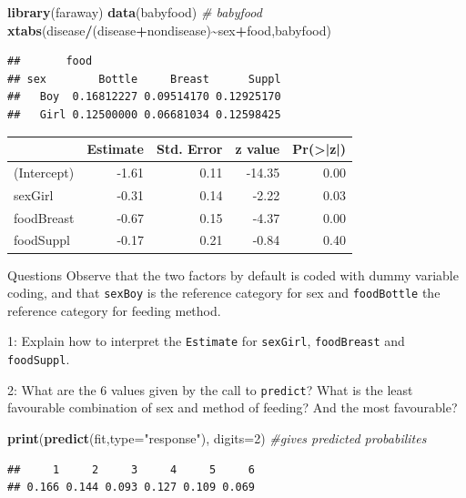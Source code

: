 \documentclass[
  ignorenonframetext,
]{beamer}
\newenvironment{Shaded}{\begin{snugshade}}{\end{snugshade}}
\newcommand{\AttributeTok}[1]{\textcolor[rgb]{0.13,0.29,0.53}{#1}}
\newcommand{\CommentTok}[1]{\textcolor[rgb]{0.56,0.35,0.01}{\textit{#1}}}
\newcommand{\DecValTok}[1]{\textcolor[rgb]{0.00,0.00,0.81}{#1}}
\newcommand{\FunctionTok}[1]{\textcolor[rgb]{0.13,0.29,0.53}{\textbf{#1}}}
\newcommand{\NormalTok}[1]{#1}
\newcommand{\SpecialCharTok}[1]{\textcolor[rgb]{0.81,0.36,0.00}{\textbf{#1}}}
\newcommand{\StringTok}[1]{\textcolor[rgb]{0.31,0.60,0.02}{#1}}
\begin{document}
\begin{frame}[fragile]
\begin{Shaded}
\begin{Highlighting}[]
\FunctionTok{library}\NormalTok{(faraway)}
\FunctionTok{data}\NormalTok{(babyfood)}
\CommentTok{\# babyfood}
\FunctionTok{xtabs}\NormalTok{(disease}\SpecialCharTok{/}\NormalTok{(disease}\SpecialCharTok{+}\NormalTok{nondisease)}\SpecialCharTok{\textasciitilde{}}\NormalTok{sex}\SpecialCharTok{+}\NormalTok{food,babyfood)}
\end{Highlighting}
\end{Shaded}

\begin{verbatim}
##       food
## sex        Bottle     Breast      Suppl
##   Boy  0.16812227 0.09514170 0.12925170
##   Girl 0.12500000 0.06681034 0.12598425
\end{verbatim}
\end{frame}

\begin{frame}
\begin{tabular}{l|r|r|r|r}
\hline
  & Estimate & Std. Error & z value & Pr(>|z|)\\
\hline
(Intercept) & -1.61 & 0.11 & -14.35 & 0.00\\
\hline
sexGirl & -0.31 & 0.14 & -2.22 & 0.03\\
\hline
foodBreast & -0.67 & 0.15 & -4.37 & 0.00\\
\hline
foodSuppl & -0.17 & 0.21 & -0.84 & 0.40\\
\hline
\end{tabular}
\end{frame}

\begin{frame}[fragile]
\begin{block}{Questions}
\protect\hypertarget{questions}{}
Observe that the two factors by default is coded with dummy variable
coding, and that \texttt{sexBoy} is the reference category for sex and
\texttt{foodBottle} the reference category for feeding method.

1: Explain how to interpret the \texttt{Estimate} for \texttt{sexGirl},
\texttt{foodBreast} and \texttt{foodSuppl}.

2: What are the 6 values given by the call to \texttt{predict}? What is
the least favourable combination of sex and method of feeding? And the
most favourable?

\begin{Shaded}
\begin{Highlighting}[]
\FunctionTok{print}\NormalTok{(}\FunctionTok{predict}\NormalTok{(fit,}\AttributeTok{type=}\StringTok{"response"}\NormalTok{), }\AttributeTok{digits=}\DecValTok{2}\NormalTok{) }\CommentTok{\#gives predicted probabilites}
\end{Highlighting}
\end{Shaded}

\begin{verbatim}
##     1     2     3     4     5     6 
## 0.166 0.144 0.093 0.127 0.109 0.069
\end{verbatim}
\end{block}
\end{frame}
\end{document}
